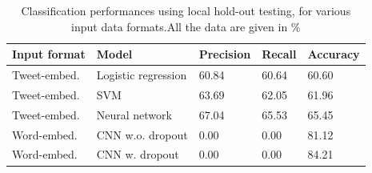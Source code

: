 \begin{table}[h]
  \centering
  \begin{tabular}[c]{lllll}
    Input format&Model&Precision&Recall&Accuracy\\
    \hline
    Tweet-embed.&Logistic regression &    60.84   & 60.64 & 60.60 \\
    Tweet-embed.&SVM                 &   63.69     & 62.05  & 61.96 \\
    Tweet-embed.&Neural network	& 67.04	& 65.53	& 65.45 \\
    Word-embed.&CNN w.o. dropout   & 0.00	& 0.00	&  81.12 \\
    Word-embed.&CNN w. dropout & 0.00 & 0.00 & 84.21
    
  \end{tabular}
  \caption{Classification performances using local hold-out testing, for various input data formats.All the data are given in \%}
  \label{tab:results}
\end{table}


